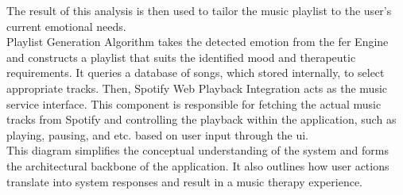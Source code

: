 The result of this analysis is then used to tailor the music playlist to the user's current emotional needs.
\\
\indent Playlist Generation Algorithm takes the detected emotion from the \gls{fer} Engine and constructs a playlist that suits the identified mood and therapeutic requirements.
It queries a database of songs, which stored internally, to select appropriate tracks.
Then, Spotify Web Playback Integration acts as the music service interface. 
This component is responsible for fetching the actual music tracks from Spotify and controlling the playback within the application, such as playing, pausing, and etc. based on user input through the \gls{ui}.
\\
\indent This diagram simplifies the conceptual understanding of the system and forms the architectural backbone of the application.
It also outlines how user actions translate into system responses and result in a music therapy experience.
\\
